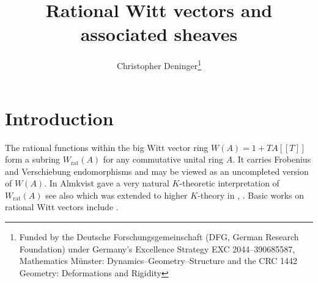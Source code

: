 \documentclass[12pt,leqno]{article}
\newcommand{\rat}{\mathrm{rat}}
\begin{document}
\title{Rational Witt vectors and associated sheaves}
\author{Christopher Deninger\footnote{Funded by the Deutsche Forschungsgemeinschaft (DFG, German Research Foundation) under Germany's Excellence Strategy EXC 2044--390685587, Mathematics M\"unster: Dynamics--Geometry--Structure and the CRC 1442 Geometry: Deformations and Rigidity}}
\date{}
\maketitle



%
\section*{Introduction}
The rational functions within the big Witt vector ring $W (A) = 1 + TA [[T]]$ form a subring $W_{\rat} (A)$ for any commutative unital ring $A$. It carries Frobenius and Verschiebung endomorphisms and may be viewed as an uncompleted version of $W (A)$. In \cite{A} Almkvist gave a very natural $K$-theoretic interpretation of $W_{\rat} (A)$ see also \cite{Gr} which was extended to higher $K$-theory in \cite{St1}, \cite{St2}. Basic works on rational Witt vectors include \cite{A, DMP, BV, CC, C1, H, Sch}.
\end{document}
